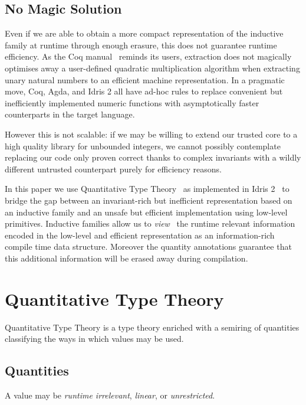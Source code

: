 \documentclass{article}
\newcommand{\idris}{Idris 2}
\newcommand{\coq}{Coq}
\newcommand{\agda}{Agda}
\begin{document}
\subsection{No Magic Solution}

Even if we are able to obtain a more compact representation of the inductive
family at runtime through enough erasure, this does not guarantee runtime efficiency.
As the \coq{} manual~\cite{Coq:manual} reminds its users, extraction does not magically
optimises away a user-defined quadratic multiplication algorithm when extracting unary
natural numbers to an efficient machine representation.
%
In a pragmatic move, \coq{}, \agda{}, and \idris{} all have ad-hoc rules to replace
convenient but inefficiently implemented numeric functions with asymptotically faster
counterparts in the target language.

However this is not scalable: if we may be willing to extend our trusted core to a
high quality library for unbounded integers, we cannot possibly contemplate replacing
our code only proven correct thanks to complex invariants with a wildly different
untrusted counterpart purely for efficiency reasons.

In this paper we use Quantitative Type
Theory~\cite{DBLP:conf/birthday/McBride16,DBLP:conf/lics/Atkey18}
as implemented in \idris{}~\cite{DBLP:conf/ecoop/Brady21} to bridge the gap between
an invariant-rich but inefficient representation based on an inductive family and
an unsafe but efficient implementation using low-level primitives.
%
Inductive families allow us to \emph{view}~\cite{DBLP:journals/jfp/McBrideM04} the
runtime relevant information encoded in the low-level and efficient representation
as an information-rich compile time data structure. Moreover the quantity annotations
guarantee that this additional information will be erased away during compilation.

\section{Quantitative Type Theory}

Quantitative Type Theory is a type theory enriched with a semiring of quantities
classifying the ways in which values may be used.

\subsection{Quantities}

A value may be \emph{runtime irrelevant}, \emph{linear}, or \emph{unrestricted}.
\end{document}

